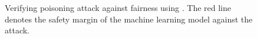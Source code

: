 \begin{figure}
	\centering
	
	\caption[Verifying fairness attacks]{Verifying poisoning attack against fairness using {\fvgm}. The red line denotes the safety margin of the machine learning model against the attack.}\label{fvgm_fig:fairness_attacks}
\end{figure}


